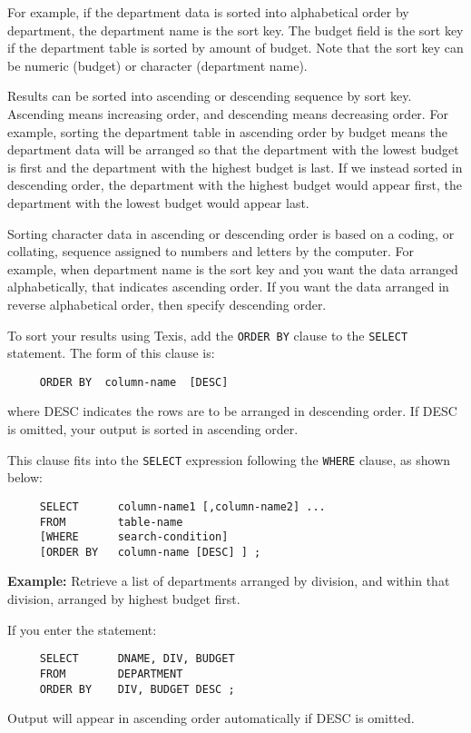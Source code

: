 For example, if the department data is sorted into alphabetical order
by department, the department name is the sort key.  The budget field
is the sort key if the department table is sorted by amount of budget.
Note that the sort key can be numeric (budget) or character
(department name).

Results can be sorted into ascending or descending sequence by sort
key.  Ascending means increasing order, and descending means
decreasing order.  For example, sorting the department table in
ascending order by budget means the department data will be arranged
so that the department with the lowest budget is first and the
department with the highest budget is last.  If we instead sorted in
descending order, the department with the highest budget would appear
first, the department with the lowest budget would appear last.

Sorting character data in ascending or descending order is based on a
coding, or collating, sequence assigned to numbers and letters by the
computer.  For example, when department name is the sort key and you
want the data arranged alphabetically, that indicates ascending order.
If you want the data arranged in reverse alphabetical order, then
specify descending order.

To sort your results using Texis, add the {\tt ORDER BY} clause to the
\verb`SELECT` statement.  The form of this clause is:
\begin{verbatim}
     ORDER BY  column-name  [DESC]
\end{verbatim}
where DESC indicates the rows are to be arranged in descending order.
If DESC is omitted, your output is sorted in ascending order.

This clause fits into the \verb`SELECT` expression following the \verb`WHERE`
clause, as shown below:
\begin{verbatim}
     SELECT      column-name1 [,column-name2] ...
     FROM        table-name
     [WHERE      search-condition]
     [ORDER BY   column-name [DESC] ] ;
\end{verbatim}

{\bf Example:}
Retrieve a list of departments arranged by division, and within that
division, arranged by highest budget first.

If you enter the statement:
\begin{verbatim}
     SELECT      DNAME, DIV, BUDGET
     FROM        DEPARTMENT
     ORDER BY    DIV, BUDGET DESC ;
\end{verbatim}
Output will appear in ascending order automatically if DESC is
omitted.

